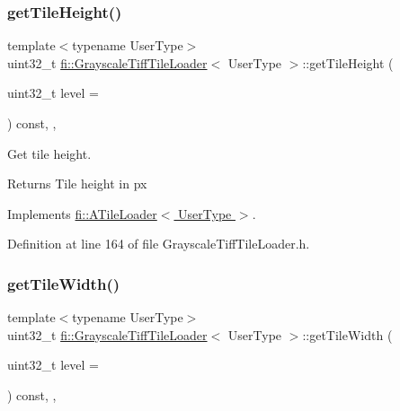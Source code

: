\subsubsection{\texorpdfstring{get\+Tile\+Height()}{getTileHeight()}}
{\footnotesize\ttfamily template$<$typename User\+Type$>$ \\
uint32\+\_\+t \hyperlink{classfi_1_1GrayscaleTiffTileLoader}{fi\+::\+Grayscale\+Tiff\+Tile\+Loader}$<$ User\+Type $>$\+::get\+Tile\+Height (\begin{DoxyParamCaption}\item[{uint32\+\_\+t}]{level = {} }\end{DoxyParamCaption}) const\hspace{0.3cm}{\ttfamily [inline]}, {\ttfamily [override]}, {\ttfamily [virtual]}}



Get tile height. 

\begin{DoxyReturn}{Returns}
Tile height in px 
\end{DoxyReturn}


Implements \hyperlink{classfi_1_1ATileLoader_a531ceb7c73457fdde7055e95abd777fa}{fi\+::\+A\+Tile\+Loader$<$ User\+Type $>$}.



Definition at line 164 of file Grayscale\+Tiff\+Tile\+Loader.\+h.

\mbox{\label{classfi_1_1GrayscaleTiffTileLoader_a273613b0ebb48732c449399fac614ebd}} 
\subsubsection{\texorpdfstring{get\+Tile\+Width()}{getTileWidth()}}
{\footnotesize\ttfamily template$<$typename User\+Type$>$ \\
uint32\+\_\+t \hyperlink{classfi_1_1GrayscaleTiffTileLoader}{fi\+::\+Grayscale\+Tiff\+Tile\+Loader}$<$ User\+Type $>$\+::get\+Tile\+Width (\begin{DoxyParamCaption}\item[{uint32\+\_\+t}]{level = {} }\end{DoxyParamCaption}) const\hspace{0.3cm}{\ttfamily [inline]}, {\ttfamily [override]}, {\ttfamily [virtual]}}



